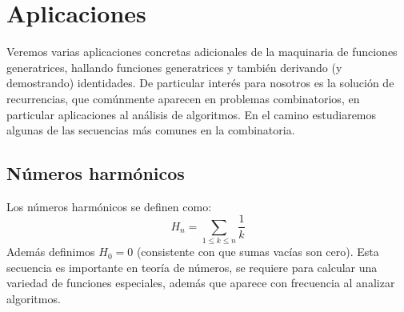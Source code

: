%

\chapter{Aplicaciones}
\label{cha:aplicaciones}

  Veremos varias aplicaciones concretas adicionales
  de la maquinaria de funciones generatrices,
  hallando funciones generatrices
  y también derivando (y demostrando) identidades.
  De particular interés para nosotros es la solución de recurrencias,
  que comúnmente aparecen en problemas combinatorios,
  en particular aplicaciones al análisis de algoritmos.
  En el camino estudiaremos algunas de las secuencias más comunes
  en la combinatoria.

\section{Números harmónicos}
\label{sec:numeros-harmonicos}

  Los números harmónicos se definen como:
  \begin{equation}
    \label{eq:harmonic-number}
    H_n = \sum_{1 \le k \le n} \frac{1}{k}
  \end{equation}
  Además definimos
  \(H_0 = 0\)
  (consistente con que sumas vacías son cero).
  Esta secuencia es importante en teoría de números,
  se requiere para calcular una variedad de funciones especiales,
  además que aparece con frecuencia al analizar algoritmos.

